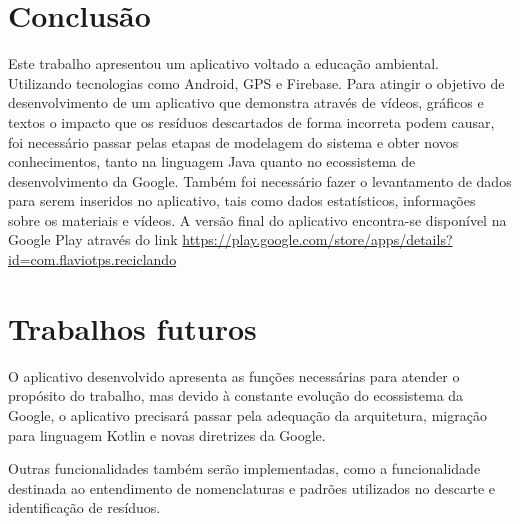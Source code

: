 \documentclass[
	12pt,				%
	openany,			%
	twoside,			%
	a4paper,			%
	english,			%
	french,				%
	spanish,			%
	brazil				%
	]{abntex2}
\begin{document}
\chapter{Conclusão}
Este trabalho apresentou um aplicativo voltado a educação ambiental.  Utilizando tecnologias como Android, GPS e Firebase. Para atingir o objetivo de desenvolvimento de um aplicativo que demonstra através de vídeos, gráficos e textos o impacto que os resíduos descartados de forma incorreta podem causar, foi necessário passar pelas etapas de modelagem do sistema e obter novos conhecimentos, tanto na linguagem Java quanto no ecossistema de desenvolvimento da Google. Também foi necessário fazer o levantamento de dados para serem inseridos no aplicativo, tais como dados estatísticos, informações sobre os materiais e vídeos. A versão final do aplicativo encontra-se disponível na Google Play através do link \href{https://play.google.com/store/apps/details?id=com.flaviotps.reciclando}{https://play.google.com/store/apps/details?id=com.flaviotps.reciclando}

\chapter{Trabalhos futuros}
O aplicativo desenvolvido apresenta as funções necessárias para atender o propósito do trabalho, mas devido à constante evolução do ecossistema da Google, o aplicativo precisará passar pela adequação da arquitetura, migração para linguagem Kotlin e novas diretrizes da Google.

Outras funcionalidades também serão implementadas, como a funcionalidade destinada ao entendimento de nomenclaturas e padrões utilizados no descarte e identificação de resíduos.


\postextual








%
%
\end{document}
